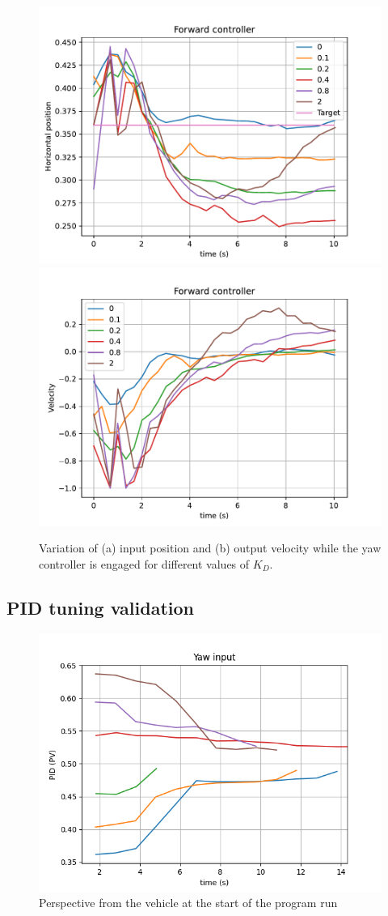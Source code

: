 \begin{figure}
  \centering
  \includegraphics[width=.45\linewidth]{img/4.1-tune/fwd_d1_feedback.pdf}
  \includegraphics[width=.45\linewidth]{img/4.1-tune/fwd_d1_speed.pdf}
  \caption{Variation of (a) input position and (b) output velocity while the yaw controller is engaged for different values of $K_{D}$.}\label{fig:tune-yaw-deriv}
\end{figure}

\subsection{PID tuning validation}

\begin{figure}
  \centering
  \includegraphics[width=.8\textwidth, keepaspectratio]{img/4.1-tune/yaw_validate_1.png}
  \caption{Perspective from the vehicle at the start of the program run}\label{fig:sim_camera_tune}
\end{figure}

